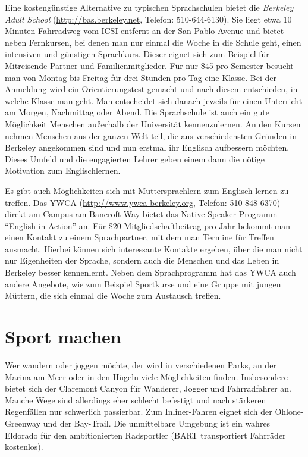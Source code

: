 \documentclass[a4paper]{scrreprt}
\begin{document}
Eine kostengünstige Alternative zu typischen Sprachschulen bietet die
\emph{Berkeley Adult School} (\url{http://bas.berkeley.net}, Telefon:
510-644-6130). Sie liegt etwa 10 Minuten Fahrradweg vom ICSI entfernt
an der San Pablo Avenue und bietet neben Fernkursen, bei denen man nur
einmal die Woche in die Schule geht, einen intensiven und günstigen
Sprachkurs. Dieser eignet sich zum Beispiel für Mitreisende Partner
und Familienmitglieder. Für nur \$45 pro Semester besucht man von
Montag bis Freitag für drei Stunden pro Tag eine Klasse. Bei der
Anmeldung wird ein Orientierungstest gemacht und nach diesem
entschieden, in welche Klasse man geht. Man entscheidet sich danach
jeweils für einen Unterricht am Morgen, Nachmittag oder Abend. Die
Sprachschule ist auch ein gute Möglichkeit Menschen außerhalb der
Universität kennenzulernen. An den Kursen nehmen Menschen aus der
ganzen Welt teil, die aus verschiedensten Gründen in Berkeley
angekommen sind und nun erstmal ihr Englisch aufbessern
möchten. Dieses Umfeld und die engagierten Lehrer geben einem dann die
nötige Motivation zum Englischlernen. 

Es gibt auch Möglichkeiten sich mit Muttersprachlern zum Englisch
lernen zu treffen. Das YWCA (\url{http://www.ywca-berkeley.org}, Telefon:
510-848-6370) direkt am Campus am Bancroft Way bietet das Native
Speaker Programm ``English in Action'' an. Für \$20
Mitgliedschaftbeitrag pro Jahr bekommt man einen Kontakt zu einem
Sprachpartner, mit dem man Termine für Treffen ausmacht. Hierbei können
sich interessante Kontakte ergeben, über die man nicht nur Eigenheiten
der Sprache, sondern auch die Menschen und das Leben in Berkeley
besser kennenlernt. Neben dem Sprachprogramm hat das YWCA auch
andere Angebote, wie zum Beispiel Sportkurse und eine Gruppe mit
jungen Müttern, die sich einmal die Woche zum Austausch treffen. 

\section{Sport machen}

Wer wandern oder joggen möchte, der wird in verschiedenen Parks, an
der Marina am Meer oder in den Hügeln viele Möglichkeiten
finden. Insbesondere bietet sich der Claremont Canyon für Wanderer,
Jogger und Fahrradfahrer an. Manche Wege sind allerdings eher schlecht
befestigt und nach stärkeren Regenfällen nur schwerlich
passierbar. Zum Inliner-Fahren eignet sich der Ohlone-Greenway und der
Bay-Trail. Die unmittelbare Umgebung ist ein wahres Eldorado für den
ambitionierten Radsportler (BART transportiert Fahrräder kostenlos).
\end{document}
